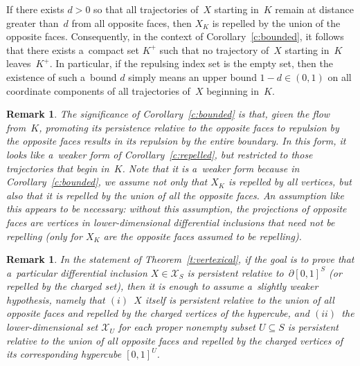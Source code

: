 \documentclass[pdftex]{sigma}
\newtheorem{Remark}[Theorem]{Remark}
\begin{document}
If there exists $d>0$ so that all trajectories of~$X$ starting in~$K$ remain at distance greater than~$d$ from all
opposite faces, then $X_K$ is repelled by the union of the opposite faces.
Consequently, in the context of Corollary~\ref{c:bounded}, it follows that there exists a~compact set $K^+$ such that
no trajectory of~$X$ starting in~$K$ leaves~$K^+$.
In particular, if the repulsing index set is the empty set, then the existence of such a~bound $d$ simply means an
upper bound $1-d\in(0,1)$ on all coordinate components of all trajectories of~$X$ beginning in~$K$.
\begin{Remark}
\label{r:promoted}
The signif\/icance of Corollary~\ref{c:bounded} is that, given the f\/low from~$K$, promoting its persistence relative
to the opposite faces to repulsion by the opposite faces results in its repulsion by the entire boundary.
In this form, it looks like a~weaker form of Corollary~\ref{c:repelled}, but restricted to those trajectories that
begin in~$K$.
Note that it is a~weaker form because in Corollary~\ref{c:bounded}, we assume not only that $X_K$ is repelled by all
vertices, but also that it is repelled by the union of all the opposite faces.
An assumption like this appears to be necessary: without this assumption, the projections of opposite faces are
vertices in lower-dimensional dif\/ferential inclusions that need not be repelling (only for $X_K$ are the opposite
faces assumed to be repelling).
\end{Remark}
\begin{Remark}
\label{r:vertexical}
In the statement of Theorem~\ref{t:vertexical}, if the goal is to prove that a~particular dif\/ferential inclusion
$X\in\mathcal X_S$ is persistent relative to~$\partial[0,1]^S$ (or repelled by the charged set), then it is enough to
assume a~slightly weaker hypothesis, namely that $(i)$~$X$ itself is persistent relative to the union of all opposite
faces and repelled by the charged vertices of the hypercube, and $(ii)$~the lower-dimensional set $\mathcal X_U$ for each
proper nonempty subset $U\subseteq S$ is persistent relative to the union of all opposite faces and repelled by the
charged vertices of its corresponding hypercube $[0,1]^U$.
\end{Remark}
\end{document}

